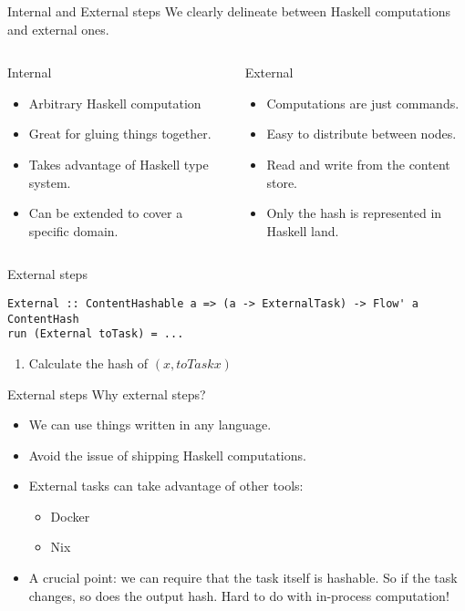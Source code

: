 \documentclass[11pt]{beamer}
\begin{document}
\begin{frame}{Internal and External steps}
We clearly delineate between Haskell computations and external ones.
\begin{columns}
\begin{column}{0.5\textwidth}
\begin{center}
Internal
\begin{itemize}
\item Arbitrary Haskell computation
\item Great for gluing things together.
\item Takes advantage of Haskell type system.
\item Can be extended to cover a specific domain.
\end{itemize}
\end{center}
\end{column}
\begin{column}{0.5\textwidth}
\begin{center}
External
\begin{itemize}
\item Computations are just commands.
\item Easy to distribute between nodes.
\item Read and write from the content store.
\item Only the hash is represented in Haskell land.
\end{itemize}
\end{center}
\end{column}
\end{columns}
\end{frame}

\begin{frame}[fragile]{External steps}
\begin{lstlisting}[basicstyle=\tiny, frame=single]
External :: ContentHashable a => (a -> ExternalTask) -> Flow' a ContentHash
run (External toTask) = ...
\end{lstlisting}
\begin{enumerate}
\item Calculate the hash of $(x, toTask x)$
\end{enumerate}
\end{frame}
\begin{frame}{External steps}
Why external steps?
\begin{itemize}
\item We can use things written in any language.
\item Avoid the issue of shipping Haskell computations.
\item External tasks can take advantage of other tools:
\begin{itemize}
\item Docker
\item Nix
\end{itemize}
\item A crucial point: we can require that the task itself is hashable. So if the task changes, so does the output hash. Hard to do with in-process computation!
\end{itemize}
\end{frame}
\end{document}
